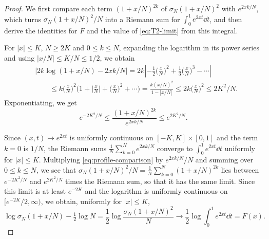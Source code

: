 \begin{proof}
We first compare each term $(1+x/N)^{2k}$ of $\sigma_N(1+x/N)^2$ with
$e^{2xk/N}$, which turns $\sigma_N(1+x/N)^2/N$ into a Riemann sum for
$\int_0^1e^{2xt}\dd t$, and then derive the identities for $F$ and the
value of \eqref{eq:T2-limit} from this integral.

For $|x|\leq K$, $N\geq2K$ and $0\leq k\leq N$, expanding the logarithm
in its power series and using $|x/N|\le K/N\le1/2$, we obtain
\begin{align*}
 &\left|2k\log(1+x/N)-2xk/N\right|
 =2k\left|-\frac12\Big(\frac xN\Big)^2+\frac13\Big(\frac xN\Big)^3-\cdots\right|\\
 &\qquad\le k\Big(\frac xN\Big)^2\Big(1+\Big|\frac xN\Big|+\Big(\frac xN\Big)^2+\cdots\Big)
 =\frac{k(x/N)^2}{1-|x/N|}\le2k\Big(\frac xN\Big)^2\le2K^2/N.
\end{align*}
Exponentiating, we get
\begin{equation}
 e^{-2K^2/N}\leq
 \frac{(1+x/N)^{2k}}{e^{2xk/N}}\leq e^{2K^2/N}.
 \label{eq:profile-comparison}
\end{equation}

Since $(x,t)\mapsto e^{2xt}$ is uniformly continuous on
$[-K,K]\times[0,1]$ and the term $k=0$ is $1/N$, the Riemann sums
$\frac1N\sum_{k=0}^Ne^{2xk/N}$ converge to $\int_0^1e^{2xt}\dd t$
uniformly for $|x|\leq K$. Multiplying \eqref{eq:profile-comparison} by
$e^{2xk/N}/N$ and summing over $0\le k\le N$, we see that
$\sigma_N(1+x/N)^2/N=\frac1N\sum_{k=0}^N(1+x/N)^{2k}$ lies between
$e^{-2K^2/N}$ and $e^{2K^2/N}$ times the Riemann sum, so that it has the
same limit. Since this limit is at least $e^{-2K}$ and the logarithm is
uniformly continuous on $[e^{-2K}/2,\infty)$, we obtain, uniformly for
$|x|\le K$,
\[
 \log\sigma_N(1+x/N)-\tfrac12\log N
 =\frac12\log\frac{\sigma_N(1+x/N)^2}N
 \longrightarrow\frac12\log\int_0^1e^{2xt}\dd t
 =F(x).
\]


\end{proof}
